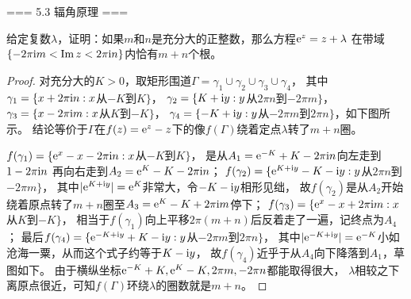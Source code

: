 === 5.3 辐角原理 ===
\begin{2}
    给定复数$\lambda$，证明：如果$m$和$n$是充分大的正整数，那么方程${\rm e}^z=z+\lambda$
    在带域$\{-2\pi{\rm i}m<\operatorname{Im}z<2\pi{\rm i}n\}$内恰有$m+n$个根。
\end{2}
\begin{proof}
    对充分大的$K>0$，取矩形围道$\Gamma=\gamma_1\cup\gamma_2\cup\gamma_3\cup\gamma_4$，
    其中$\gamma_1=\{x+2\pi{\rm i}n:x$从$-K$到$K\}$，
    $\gamma_2=\{K+{\rm i}y:y$从$2\pi n$到$-2\pi m\}$，
    $\gamma_3=\{x-2\pi{\rm i}m:x$从$K$到$-K\}$，
    $\gamma_4=\{-K+{\rm i}y:y$从$-2\pi m$到$2\pi n\}$，如下图所示。
    结论等价于$\Gamma$在$f(z)={\rm e}^z-z$下的像$f(\Gamma)$绕着定点$\lambda$转了$m+n$圈。
$f(\gamma_1)=\{{\rm e}^x-x-2\pi{\rm i}n:x$从$-K$到$K\}$，
是从$A_1={\rm e}^{-K}+K-2\pi{\rm i}n$向左走到$1-2\pi{\rm i}n$
再向右走到$A_2={\rm e}^{K}-K-2\pi{\rm i}n$；
$f(\gamma_2)=\{{\rm e}^{K+{\rm i}y}-K-{\rm i}y:y$从$2\pi n$到$-2\pi m\}$，
其中$|{\rm e}^{K+{\rm i}y}|={\rm e}^K$非常大，令$-K-{\rm i}y$相形见绌，
故$f(\gamma_2)$是从$A_2$开始绕着原点转了$m+n$圈至$A_3={\rm e}^K-K+2\pi{\rm i}m$停下；
$f(\gamma_3)=\{{\rm e}^x-x+2\pi{\rm i}m:x$从$K$到$-K\}$，
相当于$f(\gamma_1)$向上平移$2\pi(m+n)$后反着走了一遍，记终点为$A_4$；
最后$f(\gamma_4)=\{{\rm e}^{-K+{\rm i}y}+K-{\rm i}y:y$从$-2\pi m$到$2\pi n\}$，
其中$|{\rm e}^{-K+{\rm i}y}|={\rm e}^{-K}$小如沧海一粟，从而这个式子约等于$K-{\rm i}y$，
故$f(\gamma_4)$近乎于从$A_4$向下降落到$A_1$，草图如下。
由于横纵坐标${\rm e}^{-K}+K,{\rm e}^{K}-K,2\pi m,-2\pi n$都能取得很大，
$\lambda$相较之下离原点很近，可知$f(\Gamma)$环绕$\lambda$的圈数就是$m+n$。
\end{proof}
